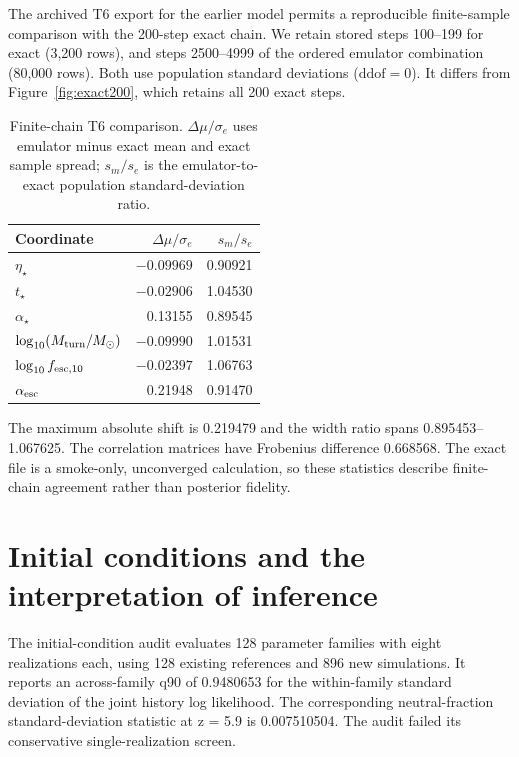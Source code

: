 The archived T6 export for the earlier model permits a reproducible finite-sample comparison with the 200-step exact chain. We retain stored steps 100--199 for exact (3,200 rows), and steps 2500--4999 of the ordered emulator combination (80,000 rows). Both use population standard deviations ($\mathrm{ddof}=0$). It differs from Figure~\ref{fig:exact200}, which retains all 200 exact steps.

\begin{table}[t]\centering\small
\caption{Finite-chain T6 comparison. $\Delta\mu/\sigma_e$ uses emulator minus exact mean and exact sample spread; $s_m/s_e$ is the emulator-to-exact population standard-deviation ratio.}\label{tab:t6}
\begin{tabular}{lrr}\toprule
Coordinate & $\Delta\mu/\sigma_e$ & $s_m/s_e$\\\midrule
$\eta_\star$ & $-0.09969$ & 0.90921\\
$t_\star$ & $-0.02906$ & 1.04530\\
$\alpha_\star$ & 0.13155 & 0.89545\\
$\log_{10}(M_{\rm turn}/M_\odot)$ & $-0.09990$ & 1.01531\\
$\log_{10}f_{{\rm esc},10}$ & $-0.02397$ & 1.06763\\
$\alpha_{\rm esc}$ & 0.21948 & 0.91470\\\bottomrule
\end{tabular}\end{table}

The maximum absolute shift is 0.219479 and the width ratio spans 0.895453--1.067625. The correlation matrices have Frobenius difference 0.668568. The exact file is a smoke-only, unconverged calculation, so these statistics describe finite-chain agreement rather than posterior fidelity.


\section{Initial conditions and the interpretation of inference}\label{initial-condition-scatter-and-limits-of-inference}\label{validation-plan}

The initial-condition audit evaluates 128 parameter families with eight realizations each, using 128 existing references and 896 new simulations. It reports an across-family q90 of 0.9480653 for the within-family standard deviation of the joint history log likelihood. The corresponding neutral-fraction standard-deviation statistic at z = 5.9 is 0.007510504. The audit failed its conservative single-realization screen.

